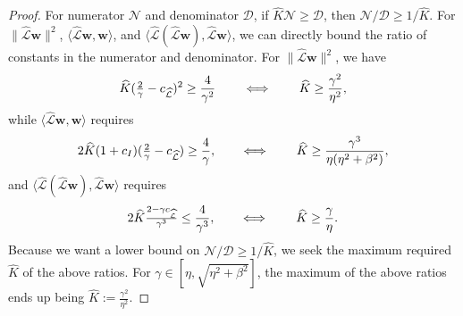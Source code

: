 \documentclass[review]{siamart}
\begin{document}
\begin{proof}
For numerator $\mathcal{N}$ and denominator $\mathcal{D}$, if $\widehat{K}\mathcal{N}
\geq \mathcal{D}$, then $\mathcal{N}/\mathcal{D} \geq 1 / \widehat{K}$. For 
$\|\widehat{\mathcal{L}}\mathbf{w}\|^2$, $\langle\widehat{\mathcal{L}}\mathbf{w},\mathbf{w}\rangle$,
and $\langle\widehat{\mathcal{L}}(\widehat{\mathcal{L}}\mathbf{w}),\widehat{\mathcal{L}}\mathbf{w}\rangle$,
we can directly bound the ratio of constants in the numerator and denominator.
For $\|\widehat{\mathcal{L}}\mathbf{w}\|^2$, we have
%
\begin{align*}
\widehat{K}(\tfrac{2}{\gamma}-c_{\widehat{\mathcal{L}}})^2 \geq \frac{4}{\gamma^2}
	\hspace{5ex}\Longleftrightarrow\hspace{5ex}
\widehat{K} \geq \frac{\gamma^2}{\eta^2},
\end{align*}
%
while $\langle\widehat{\mathcal{L}}\mathbf{w},\mathbf{w}\rangle$ requires
%
\begin{align*}
2\widehat{K}(1+c_I)(\tfrac{2}{\gamma}-c_{\widehat{\mathcal{L}}})\geq \frac{4}{\gamma},
	\hspace{5ex}\Longleftrightarrow\hspace{5ex}
\widehat{K} \geq \frac{\gamma^3}{\eta(\eta^2+\beta^2)},
\end{align*}
%
and $\langle\widehat{\mathcal{L}}(\widehat{\mathcal{L}}\mathbf{w}),\widehat{\mathcal{L}}\mathbf{w}\rangle$
requires
%
\begin{align*}
2\widehat{K}\tfrac{2-\gamma c_{\widehat{\mathcal{L}}}}{\gamma^3} \leq \frac{4}{\gamma^3},
	\hspace{5ex}\Longleftrightarrow\hspace{5ex}
\widehat{K} \geq \frac{\gamma}{\eta}.
\end{align*}
%
Because we want a lower bound on $\mathcal{N}/\mathcal{D} \geq 1/\widehat{K}$,
we seek the maximum required $\widehat{K}$ of the above ratios. For
$\gamma \in[\eta,\sqrt{\eta^2+\beta^2}]$, the maximum of the
above ratios ends up being $\widehat{K} := \tfrac{\gamma^2}{\eta^2}$.


\end{proof}
\end{document}
